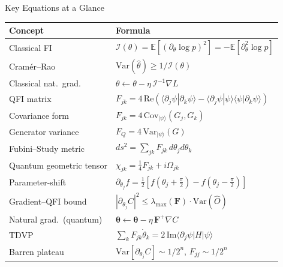 \documentclass[aspectratio=169,10pt]{beamer}
\newcommand{\btheta}{\boldsymbol{\theta}}
\newcommand{\QFI}{\mathbf{F}}
\newcommand{\E}{\mathbb{E}}
\newcommand{\Variance}{\mathrm{Var}}
\newcommand{\FI}{\mathcal{I}}    %
\begin{document}
\begin{frame}{Key Equations at a Glance}
  \small
  \begin{center}
  \renewcommand{\arraystretch}{1.2}
  \begin{tabular}{p{3.8cm}p{7.2cm}}
    \toprule
    \textbf{Concept} & \textbf{Formula} \\
    \midrule
    Classical FI &
      $\FI(\theta)=\E[(\partial_\theta\log p)^2]
                 =-\E[\partial_\theta^2\log p]$ \\
    Cramér--Rao &
      $\Variance(\hat\theta)\geq 1/\FI(\theta)$ \\
    Classical nat.\ grad. &
      $\theta\leftarrow\theta-\eta\,\FI^{-1}\nabla L$ \\
    QFI matrix &
      $F_{jk}=4\,\mathrm{Re}(\langle\partial_j\psi|\partial_k\psi\rangle
             -\langle\partial_j\psi|\psi\rangle
              \langle\psi|\partial_k\psi\rangle)$ \\
    Covariance form &
      $F_{jk}=4\,\mathrm{Cov}_{|\psi\rangle}(G_j,G_k)$ \\
    Generator variance &
      $F_Q=4\,\Variance_{|\psi\rangle}(G)$ \\
    Fubini--Study metric &
      $ds^2=\sum_{jk}F_{jk}\,d\theta_j d\theta_k$ \\
    Quantum geometric tensor &
      $\chi_{jk}=\frac{1}{4}F_{jk}+i\Omega_{jk}$ \\
    Parameter-shift &
      $\partial_{\theta_j}f=\frac{1}{2}[f(\theta_j+\frac\pi2)
                                       -f(\theta_j-\frac\pi2)]$ \\
    Gradient--QFI bound &
      $|\partial_{\theta_j}C|^2\leq\lambda_{\max}(\QFI)\cdot\Variance(\hat{O})$ \\
    Natural grad.\ (quantum) &
      $\btheta\leftarrow\btheta-\eta\,\QFI^+\nabla C$ \\
    TDVP &
      $\sum_k F_{jk}\dot\theta_k=2\,\mathrm{Im}\langle\partial_j\psi|H|\psi\rangle$ \\
    Barren plateau &
      $\Variance[\partial_{\theta_j}C]\sim 1/2^n$,
      $F_{jj}\sim 1/2^n$ \\
    \bottomrule
  \end{tabular}
  \end{center}
\end{frame}
\end{document}
